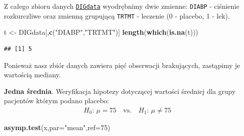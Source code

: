 \documentclass[polish,]{book}
\newenvironment{Shaded}{\begin{snugshade}}{\end{snugshade}}
\newcommand{\CommentTok}[1]{\textcolor[rgb]{0.56,0.35,0.01}{\textit{#1}}}
\newcommand{\DataTypeTok}[1]{\textcolor[rgb]{0.13,0.29,0.53}{#1}}
\newcommand{\DecValTok}[1]{\textcolor[rgb]{0.00,0.00,0.81}{#1}}
\newcommand{\KeywordTok}[1]{\textcolor[rgb]{0.13,0.29,0.53}{\textbf{#1}}}
\newcommand{\NormalTok}[1]{#1}
\newcommand{\OperatorTok}[1]{\textcolor[rgb]{0.81,0.36,0.00}{\textbf{#1}}}
\newcommand{\StringTok}[1]{\textcolor[rgb]{0.31,0.60,0.02}{#1}}
\begin{document}
Z całego zbioru danych \href{https://rdrr.io/cran/asympTest/man/DIGdata.html}{\texttt{DIGdata}} wyodrębnimy dwie zmienne: \texttt{DIABP} - ciśnienie rozkurczliwe oraz zmienną grupującą \texttt{TRTMT} - leczenie (0 - placebo, 1 - lek).

\begin{Shaded}
\begin{Highlighting}[]
\NormalTok{t <-}\StringTok{ }\NormalTok{DIGdata[,}\KeywordTok{c}\NormalTok{(}\StringTok{"DIABP"}\NormalTok{,}\StringTok{"TRTMT"}\NormalTok{)]}
\KeywordTok{length}\NormalTok{(}\KeywordTok{which}\NormalTok{(}\KeywordTok{is.na}\NormalTok{(t)))}
\end{Highlighting}
\end{Shaded}

\begin{verbatim}
## [1] 5
\end{verbatim}

Ponieważ nasz zbiór danych zawiera pięć obserwacji brakujących, zastąpimy je wartością mediany.

\begin{Shaded}
\end{Shaded}

\textbf{Jedna średnia}. Weryfikacja hipotezy dotyczącej wartości średniej dla grupy pacjentów którym podano placebo:
\[
\begin{array}{ll}
H_0:\,\mu = 75\quad\mbox{vs.}\quad H_1:\,\mu \neq 75
\end{array}
\]

\begin{Shaded}
\begin{Highlighting}[]
\KeywordTok{asymp.test}\NormalTok{(x,}\DataTypeTok{par=}\StringTok{"mean"}\NormalTok{,}\DataTypeTok{ref=}\DecValTok{75}\NormalTok{)}
\end{Highlighting}
\end{Shaded}
\end{document}
